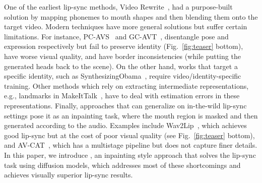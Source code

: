 One of the earliest lip-sync methods, Video Rewrite~\cite{video-rewrite}, had a purpose-built solution by mapping phonemes to mouth shapes and then blending them onto the target video. Modern techniques have more general solutions but suffer certain limitations. 
For instance, PC-AVS~\cite{pcavs} and GC-AVT~\cite{gcavt}, disentangle pose and expression respectively but fail to preserve identity (Fig.~\ref{fig:teaser} bottom), have worse visual quality, and have border inconsistencies (while putting the generated heads back to the scene). On the other hand, works that target a specific identity, such as SynthesizingObama~\cite{synthesizing-obama}, require video/identity-specific training. Other methods which rely on extracting intermediate representations, e.g., landmarks in MakeItTalk~\cite{makeittalk}, have to deal with estimation errors in these representations. Finally, approaches that can generalize on in-the-wild lip-sync settings pose it as an inpainting task, where the mouth region is masked and then generated according to the audio. Examples include Wav2Lip~\cite{wav2lip}, which achieves good lip-sync but at the cost of poor visual quality (see Fig.~\ref{fig:teaser} bottom), and AV-CAT~\cite{avcat}, which has a multistage pipeline but does not capture finer details. In this paper, we introduce \ours, an inpainting style approach that solves the lip-sync task using diffusion models, which addresses most of these shortcomings and achieves visually superior lip-sync results. 


























 





